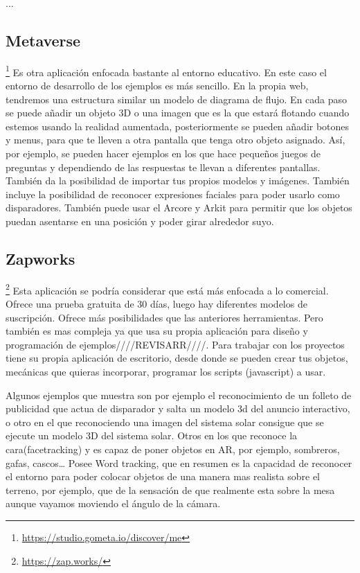 ...

\subsection{Metaverse}\footnote{\url{https://studio.gometa.io/discover/me}}
Es otra aplicación enfocada bastante al entorno educativo. En este caso el entorno de desarrollo de los ejemplos es más sencillo. En la propia web, tendremos una estructura similar un modelo de diagrama de flujo. En cada paso se puede añadir un objeto 3D o una imagen que es la que estará flotando cuando estemos usando la realidad aumentada, posteriormente se pueden añadir botones y menus, para que te lleven a otra pantalla que tenga otro objeto asignado. Así, por ejemplo, se pueden hacer ejemplos en los que hace pequeños juegos de preguntas y dependiendo de las respuestas te llevan a diferentes pantallas.
También da la posibilidad de importar tus propios modelos y imágenes.
También incluye la posibilidad de reconocer expresiones faciales para poder usarlo como disparadores.
También puede usar el Arcore y Arkit para permitir que los objetos puedan asentarse en una posición y poder girar alrededor suyo.

\subsection{Zapworks}\footnote{\url{https://zap.works/}}
Esta aplicación se podría considerar que está más enfocada a lo comercial. Ofrece una prueba gratuita de 30 días, luego hay diferentes modelos de suscripción.
Ofrece más posibilidades que las anteriores herramientas. Pero también es mas compleja ya que usa su propia aplicación para diseño y programación de ejemplos////REVISARR////.
Para trabajar con los proyectos tiene su propia aplicación de escritorio, desde donde se pueden crear tus objetos, mecánicas que quieras incorporar, programar los scripts (javascript) a usar.

Algunos ejemplos que muestra son por ejemplo el reconocimiento de un folleto de publicidad que actua de disparador y salta un modelo 3d del anuncio interactivo, o otro en el que reconociendo una imagen del sistema solar consigue que se ejecute un modelo 3D del sistema solar. 
Otros en los que reconoce la cara(facetracking) y es capaz de poner objetos en AR, por ejemplo, sombreros, gafas, cascos…
Posee Word tracking, que en resumen es la capacidad de reconocer el entorno para poder colocar objetos de una manera mas realista sobre el terreno, por ejemplo, que de la sensación de que realmente esta sobre la mesa aunque vayamos moviendo el ángulo de la cámara.

